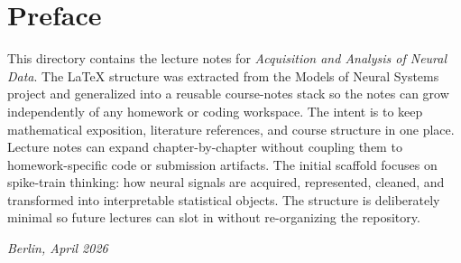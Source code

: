 \chapter*{Preface}

This directory contains the lecture notes for \emph{Acquisition and Analysis of Neural Data}. The LaTeX structure was extracted from the Models of Neural Systems project and generalized into a reusable course-notes stack so the notes can grow independently of any homework or coding workspace.
The intent is to keep mathematical exposition, literature references, and course structure in one place. Lecture notes can expand chapter-by-chapter without coupling them to homework-specific code or submission artifacts.
The initial scaffold focuses on spike-train thinking: how neural signals are acquired, represented, cleaned, and transformed into interpretable statistical objects. The structure is deliberately minimal so future lectures can slot in without re-organizing the repository.

\bigskip
\noindent\textit{Berlin, April 2026}
